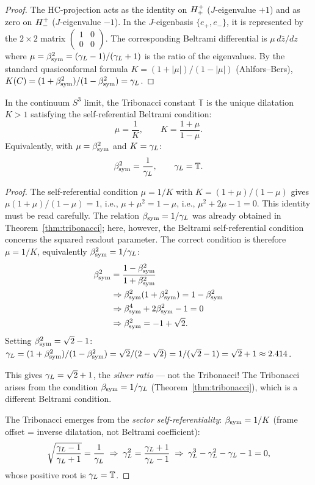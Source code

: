 \begin{proof}
The HC-projection acts as the identity on $H^+_+$ ($J$-eigenvalue $+1$)
and as zero on $H^+_-$ ($J$-eigenvalue $-1$).
In the $J$-eigenbasis $\{e_+,e_-\}$, it is represented by the
$2\times 2$ matrix $\begin{pmatrix}1&0\\0&0\end{pmatrix}$.
The corresponding Beltrami differential is $\mu\,d\bar z/dz$ where
$\mu = \beta_{\mathrm{sym}}^2 = (\gamma_L-1)/(\gamma_L+1)$ is the ratio of the eigenvalues.
By the standard quasiconformal formula
$K = (1+|\mu|)/(1-|\mu|)$ (Ahlfors--Bers),
$K(C) = (1+\beta_{\mathrm{sym}}^2)/(1-\beta_{\mathrm{sym}}^2) = \gamma_L$.
\end{proof}

\begin{theorem}
\label{thm:tribonacci-beltrami}
In the continuum $S^3$ limit, the Tribonacci constant $\mathbb{T}$
is the unique dilatation $K>1$ satisfying the self-referential
Beltrami condition:
\[
  \mu = \frac{1}{K}, \qquad K = \frac{1+\mu}{1-\mu}.
\]
Equivalently, with $\mu = \beta_{\mathrm{sym}}^2$ and $K = \gamma_L$:
\[
  \beta_{\mathrm{sym}}^2 = \frac{1}{\gamma_L},
  \qquad \gamma_L = \mathbb{T}.
\]
\end{theorem}

\begin{proof}
The self-referential condition $\mu = 1/K$ with $K = (1+\mu)/(1-\mu)$
gives $\mu(1+\mu)/(1-\mu) = 1$, i.e.,
$\mu + \mu^2 = 1 - \mu$, i.e., $\mu^2 + 2\mu - 1 = 0$.
This identity must be read carefully. The relation $\beta_{\rm sym} = 1/\gamma_L$ was already obtained in Theorem~\ref{thm:tribonacci}; here, however, the Beltrami self-referential condition concerns the squared readout parameter. The correct condition is therefore $\mu = 1/K$, equivalently $\beta_{\mathrm{sym}}^2 = 1/\gamma_L$:
\[
\begin{aligned}
\beta_{\mathrm{sym}}^2 &= \frac{1-\beta_{\mathrm{sym}}^2}{1+\beta_{\mathrm{sym}}^2}\\
&\Rightarrow \beta_{\mathrm{sym}}^2(1+\beta_{\mathrm{sym}}^2)=1-\beta_{\mathrm{sym}}^2\\
&\Rightarrow \beta_{\mathrm{sym}}^4+2\beta_{\mathrm{sym}}^2-1=0\\
&\Rightarrow \beta_{\mathrm{sym}}^2=-1+\sqrt{2}.
\end{aligned}
\]
Setting $\beta_{\mathrm{sym}}^2 = \sqrt{2}-1$: $\gamma_L = (1+\beta_{\mathrm{sym}}^2)/(1-\beta_{\mathrm{sym}}^2) = \sqrt{2}/(2-\sqrt{2}) = 1/(\sqrt{2}-1) = \sqrt{2}+1 \approx 2.414$.

This gives $\gamma_L = \sqrt{2}+1$, the \emph{silver ratio} --- not the Tribonacci!
The Tribonacci arises from the condition $\beta_{\mathrm{sym}} = 1/\gamma_L$ (Theorem~\ref{thm:tribonacci}),
which is a different Beltrami condition.

\medskip
The Tribonacci emerges from the \emph{sector self-referentiality}:
$\beta_{\mathrm{sym}} = 1/K$ (frame offset = inverse dilatation, not Beltrami coefficient):
\[
  \sqrt{\frac{\gamma_L-1}{\gamma_L+1}} = \frac{1}{\gamma_L}
  \;\Rightarrow\;
  \gamma_L^2 = \frac{\gamma_L+1}{\gamma_L-1}
  \;\Rightarrow\;
  \gamma_L^3 - \gamma_L^2 - \gamma_L - 1 = 0,
\]
whose positive root is $\gamma_L = \mathbb{T}$.
\end{proof}

